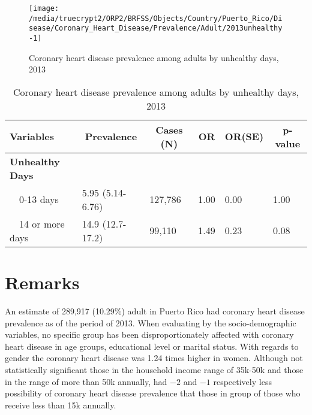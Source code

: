 \begin{figure}[H]
\caption{Coronary heart disease prevalence among adults by unhealthy days, 2013}
\label{fig:unhlthy.Coronary_Heart_Disease.2013}

\begin{knitrout}
\color{fgcolor}

{\centering \texttt{[image: /media/truecrypt2/ORP2/BRFSS/Objects/Country/Puerto\_Rico/Disease/Coronary\_Heart\_Disease/Prevalence/Adult/2013unhealthy-1]} 

}



\end{knitrout}
\end{figure}

\begin{table}[H]
\caption{Coronary heart disease prevalence among adults by unhealthy days, 2013\label{tab:unhlthy.Coronary_Heart_Disease.2013}} 
\begin{center}
\begin{tabular}{llllll}
\hline\hline
\multicolumn{1}{l}{Variables}&\multicolumn{1}{c}{Prevalence}&\multicolumn{1}{c}{Cases (N)}&\multicolumn{1}{c}{OR}&\multicolumn{1}{c}{OR(SE)}&\multicolumn{1}{c}{p-value}\tabularnewline
\hline
{\bfseries Unhealthy Days}&&&&&\tabularnewline
~~0-13 days&5.95 (5.14-6.76)&127,786&1.00&0.00&1.00\tabularnewline
~~14 or more days&14.9 (12.7-17.2)& 99,110&1.49&0.23&0.08\tabularnewline
\hline
\end{tabular}\end{center}

\end{table}


 \section{Remarks}

An estimate of 289,917 
(10.29\%) adult in Puerto Rico had coronary heart disease prevalence as of the period of 2013.
When evaluating by the socio-demographic variables, no specific group has been disproportionately affected with coronary heart disease in age groups, educational level or marital status. With regards to gender the coronary heart disease was 1.24 times higher in women. Although not statistically significant those in the household income range of 35k-50k and those in the range of more than 50k annually, had \ensuremath{-2} and \ensuremath{-1} respectively less possibility of coronary heart disease prevalence that those  in group of those who receive less than 15k annually.

